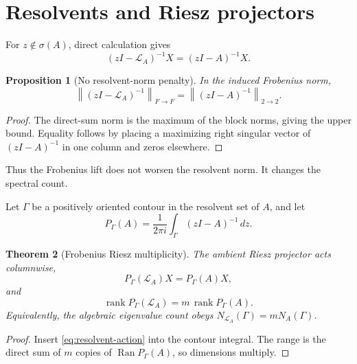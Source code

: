 \documentclass[12pt]{article}
\newtheorem{theorem}{Theorem}[section]
\newtheorem{proposition}[theorem]{Proposition}
\theoremstyle{remark}
\newcommand{\cL}{\mathcal L}
\newcommand{\rank}{\operatorname{rank}}
\newcommand{\norm}[1]{\left\lVert#1\right\rVert}
\begin{document}
\section{Resolvents and Riesz projectors}

For $z\notin\sigma(A)$, direct calculation gives
\begin{equation}\label{eq:resolvent-action}
 (zI-\cL_A)^{-1}X=(zI-A)^{-1}X.
\end{equation}

\begin{proposition}[No resolvent-norm penalty]\label{prop:resolvent}
In the induced Frobenius norm,
\begin{equation}\label{eq:resolvent-norm}
 \norm{(zI-\cL_A)^{-1}}_{F\to F}
 =\norm{(zI-A)^{-1}}_{2\to2}.
\end{equation}
\end{proposition}

\begin{proof}
The direct-sum norm is the maximum of the block norms, giving the upper
bound.  Equality follows by placing a maximizing right singular vector of
$(zI-A)^{-1}$ in one column and zeros elsewhere.
\end{proof}

Thus the Frobenius lift does not worsen the resolvent norm.  It changes the
spectral count.

Let $\Gamma$ be a positively oriented contour in the resolvent set of $A$,
and let
\begin{equation}\label{eq:base-riesz}
 P_\Gamma(A)=\frac{1}{2\pi i}\int_\Gamma(zI-A)^{-1}\,dz.
\end{equation}

\begin{theorem}[Frobenius Riesz multiplicity]\label{thm:riesz-rank}
The ambient Riesz projector acts columnwise,
\begin{equation}\label{eq:projector-action}
 P_\Gamma(\cL_A)X=P_\Gamma(A)X,
\end{equation}
and
\begin{equation}\label{eq:rank-law}
 \boxed{\rank P_\Gamma(\cL_A)
 =m\,\rank P_\Gamma(A).}
\end{equation}
Equivalently, the algebraic eigenvalue count obeys
$N_{\cL_A}(\Gamma)=mN_A(\Gamma)$.
\end{theorem}

\begin{proof}
Insert \eqref{eq:resolvent-action} into the contour integral.  The range is
the direct sum of $m$ copies of $\operatorname{Ran}P_\Gamma(A)$, so dimensions
multiply.
\end{proof}
\end{document}
